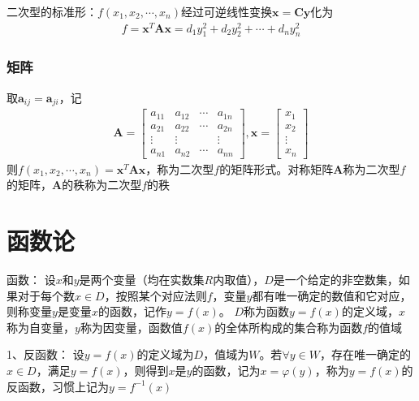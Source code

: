 \documentclass[12pt]{book}
\begin{document}
二次型的标准形：$f(x_1,x_2,\cdots,x_n)$经过可逆线性变换$\bm{x}=\bm{C}\bm{y}$化为
\begin{gather*}
    f=\bm{x}^{T} \bm{A} \bm{x} = d_{1} y_{1}^{2} + d_{2} y_{2}^{2} + \cdots + d_{n} y_{n}^{2}
\end{gather*}




\subsection{矩阵}


取$\bm{a}_{ij} = \bm{a}_{ji}$，记
\begin{gather*}
    \bm{A} = \begin{bmatrix}
        a_{11} & a_{12} & \cdots & a_{1n} \\
        a_{21} & a_{22} & \cdots & a_{2n} \\
        \vdots & \vdots &        & \vdots \\
        a_{n1} & a_{n2} & \cdots & a_{nn} 
    \end{bmatrix},
    \bm{x} = \begin{bmatrix}
        x_1\\x_2\\\vdots\\x_n
    \end{bmatrix}
\end{gather*}
则$f(x_1,x_2,\cdots,x_n)=\bm{x}^{T}\bm{A}\bm{x}$，称为二次型$f$的矩阵形式。对称矩阵$\bm{A}$称为二次型$f$的矩阵，$\bm{A}$的秩称为二次型$f$的秩









\chapter{函数论}




函数：
设$x$和$y$是两个变量（均在实数集$R$内取值），$D$是一个给定的非空数集，如果对于每个数$x\in D$，按照某个对应法则$f$，变量$y$都有唯一确定的数值和它对应，则称变量$y$是变量$x$的函数，记作$y= f(x)$。
$D$称为函数$y= f(x)$的定义域，$x$称为自变量，$y$称为因变量，函数值$ f(x)$的全体所构成的集合称为函数$f$的值域

1、反函数：
设$y= f(x)$的定义域为$D$，值域为$W$。若$\forall y \in W$，存在唯一确定的$x \in D$，满足$y= f(x)$，则得到$x$是$y$的函数，记为$ x =\varphi(y)$，称为$y= f(x)$的反函数，习惯上记为$ y= f^{-1}(x)$
\end{document}
